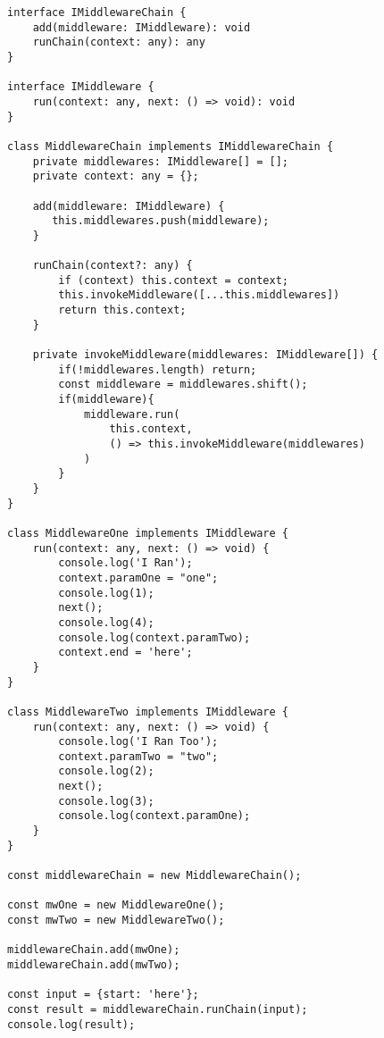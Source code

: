 \documentclass[12pt]{article}
\begin{document}
\begin{lstlisting}[caption=Full Script,label=code:fullscript]
interface IMiddlewareChain {
    add(middleware: IMiddleware): void
    runChain(context: any): any
}

interface IMiddleware {
    run(context: any, next: () => void): void
}

class MiddlewareChain implements IMiddlewareChain {
    private middlewares: IMiddleware[] = [];
    private context: any = {};

    add(middleware: IMiddleware) {
       this.middlewares.push(middleware);
    }

    runChain(context?: any) {
        if (context) this.context = context;
        this.invokeMiddleware([...this.middlewares])
        return this.context;
    }

    private invokeMiddleware(middlewares: IMiddleware[]) {
        if(!middlewares.length) return;
        const middleware = middlewares.shift();
        if(middleware){
            middleware.run(
                this.context, 
                () => this.invokeMiddleware(middlewares)
            )
        }
    }
}

class MiddlewareOne implements IMiddleware {
    run(context: any, next: () => void) {
        console.log('I Ran');
        context.paramOne = "one";
        console.log(1);
        next();
        console.log(4);
        console.log(context.paramTwo);
        context.end = 'here';
    }
}

class MiddlewareTwo implements IMiddleware {
    run(context: any, next: () => void) {
        console.log('I Ran Too');
        context.paramTwo = "two";
        console.log(2);
        next();
        console.log(3);
        console.log(context.paramOne);
    }
}

const middlewareChain = new MiddlewareChain();

const mwOne = new MiddlewareOne();
const mwTwo = new MiddlewareTwo();

middlewareChain.add(mwOne);
middlewareChain.add(mwTwo);

const input = {start: 'here'};
const result = middlewareChain.runChain(input);
console.log(result);
\end{lstlisting}
\end{document}
